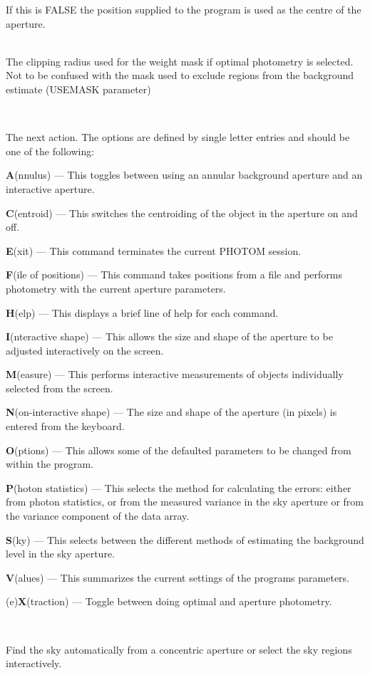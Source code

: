 \documentclass[twoside,11pt]{article}
\renewcommand{\_}{\texttt{\symbol{95}}}
\newcommand{\sstsubsection}[1]{ \item[{#1}] \mbox{} \\}
\newcommand{\sstsubsection}[1]{\item[{#1}]}
\begin{document}
{{{         If this is FALSE the position supplied to the program is used
         as the centre of the aperture.
      }
      \sstsubsection{
         CLIP = \_REAL (Read)
      }{
         The clipping radius used for the weight mask if optimal photometry
         is selected. Not to be confused with the mask used to exclude
         regions from the background estimate (USEMASK parameter)
      }
      \sstsubsection{
         COMMAND = \_CHAR (Read)
      }{
         The next action. The options are
         defined by single letter entries and should be one of the
         following:
         \begin{description}
         \item \textbf{A}(nnulus) --- This toggles between using an annular background
              aperture and an interactive aperture.
         \item \textbf{C}(entroid) --- This switches the centroiding of the object in
              the aperture on and off.
         \item \textbf{E}(xit) --- This command terminates the current PHOTOM session.
         \item \textbf{F}(ile of positions) --- This command takes positions from a
              file and performs photometry with the current aperture
              parameters.
         \item \textbf{H}(elp) --- This displays a brief line of help for each command.
         \item \textbf{I}(nteractive shape) --- This allows the size and shape of the
              aperture to be adjusted interactively on the screen.
         \item \textbf{M}(easure) --- This performs interactive measurements of objects
              individually selected from the screen.
         \item \textbf{N}(on-interactive shape) --- The size and shape of
                       the  aperture (in pixels) is entered from the keyboard.
         \item \textbf{O}(ptions) --- This allows some of the defaulted parameters to
              be changed from within the program.
         \item \textbf{P}(hoton statistics) --- This selects the method for calculating
              the errors: either from photon statistics, or from the
              measured variance in the sky aperture or from the variance
              component of the data array.
         \item \textbf{S}(ky) --- This selects between the different methods of
              estimating the background level in the sky aperture.
         \item \textbf{V}(alues) --- This summarizes the current settings of the
              programs parameters.
         \item (e)\textbf{X}(traction) --- Toggle between doing optimal and aperture
        photometry.
         \end{description}
      }
      \sstsubsection{
         CONCEN = \_LOGICAL (Read)
      }{
         Find the sky automatically from a concentric aperture or
         select the sky regions interactively.

}}}
\end{document}
